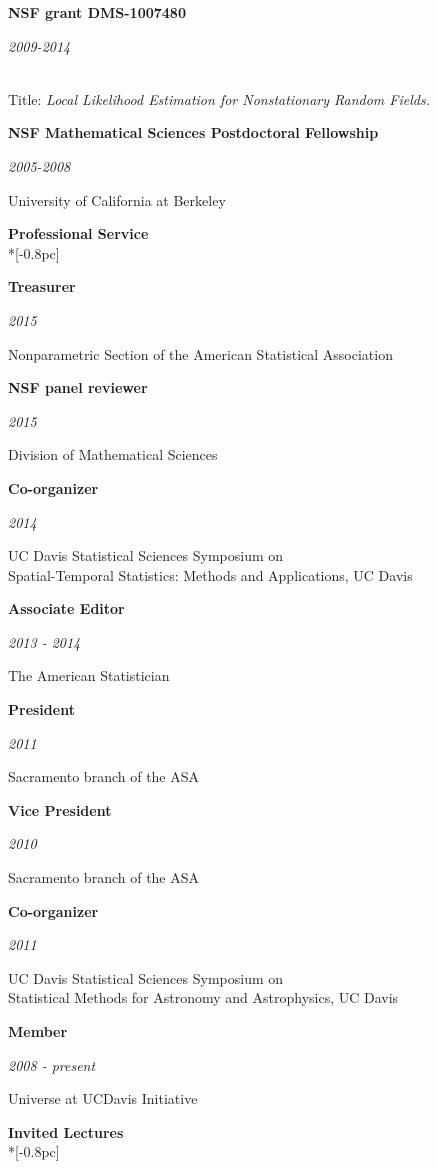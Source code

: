 \documentclass[11pt]{article}
\newcommand{\head}[1]{
  \vspace{10pt}
  {\Large \bf #1} \\*[-0.8pc]
  \underline{\hspace{6.07in}}}
\newcommand{\datedentry}[2]{
  \vspace{5pt}
  \begin{minipage}{5in}{\textbf{#1}}\end{minipage}
  \hfill
  \begin{minipage}{1in}{\hfill\textit{#2}}\end{minipage}
  }
\begin{document}
\datedentry{NSF grant DMS-1007480 }{2009-2014}\\
Title: {\sl Local Likelihood Estimation for Nonstationary Random Fields.}

\vspace{9pt}

\datedentry{NSF Mathematical Sciences Postdoctoral Fellowship}{2005-2008}
University of California at Berkeley



\vspace{5pt}
\head{Professional Service}


\datedentry{Treasurer}{2015}
Nonparametric Section of the American Statistical Association

\vspace{7pt}

\datedentry{NSF panel reviewer}{2015}
Division of Mathematical Sciences

\vspace{7pt}


\datedentry{Co-organizer}{2014}
UC Davis Statistical Sciences Symposium on \\
Spatial-Temporal Statistics: Methods and Applications, UC Davis

\vspace{7pt}

\datedentry{Associate Editor}{2013 - 2014}
The American Statistician

\vspace{7pt}

\datedentry{President}{2011}
Sacramento branch of the ASA

\vspace{7pt}

\datedentry{Vice President}{2010}
Sacramento branch of the ASA

\vspace{7pt}

\datedentry{Co-organizer}{2011}
UC Davis Statistical Sciences Symposium on \\
Statistical Methods for Astronomy and Astrophysics, UC Davis

\vspace{7pt}

\datedentry{Member}{2008 - present}
Universe at UCDavis Initiative


\vspace{5pt}
\head{Invited Lectures}
\end{document}
